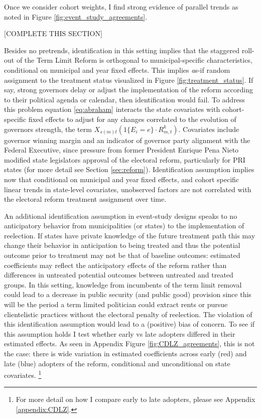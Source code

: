 \documentclass[12pt]{amsart}
\makeatletter
\def\subsection{\@startsection{subsection}{2}
	\z@{.8\linespacing\@plus.7\linespacing}{.7\linespacing}{\large}}
\numberwithin{equation}{section}
\theoremstyle{definition}
\theoremstyle{definition}
\theoremstyle{definition}
\makeatother
\begin{document}
\subsection{Identification \label{sec:identification}}
 
Once we consider cohort weights, I find strong evidence of parallel trends as noted in Figure \ref{fig:event_study_agreements}. 

[COMPLETE THIS SECTION]

 
Besides no pretrends, identification in this setting implies that the staggered roll-out of the Term Limit Reform is orthogonal to municipal-specific characteristics, conditional on municipal and year fixed effects. This implies {\emph as-if} random assignment to the treatment status visualized in Figure \ref{fig:treatment_status}. If say, strong governors delay or adjust the implementation of the reform according to their political agenda or calendar, then identification would fail. To address this problem equation \ref{eq:abraham} interacts the state covariates with cohort-specific fixed effects to adjust for any changes correlated to the evolution of governors strength, the term $X_{s(m)t} (1\{E_i=e\} \cdot R^k_{m,t})$. Covariates include governor winning margin and an indicator of governor party alignment with the Federal Executive, since pressure from former President Enrique Pena Nieto modified state legislators approval of the electoral reform, particularly for PRI states (for more detail see Section \ref{sec:reform}). Identification assumption implies now that conditional on municipal and year fixed effects, and cohort specific linear trends in state-level covariates, unobserved factors are not correlated with the electoral reform treatment assignment over time.     

An additional identification assumption in event-study designs speaks to no anticipatory behavior from municipalities (or states) to the implementation of reelection. If states have private knowledge of the future treatment path this may change their behavior in anticipation to being treated and thus the potential outcome prior to treatment may not be that of baseline outcomes: estimated coefficients may reflect the anticipatory effects of the reform rather than differences in untreated potential outcomes between untreated and treated groups. %
In this setting, knowledge from incumbents of the term limit removal could lead to a decrease in public security (and public good) provision since this will be the period a term limited politician could extract rents or pursue clientelistic practices without the electoral penalty of reelection. The violation of this identification assumption would lead to a (positive) bias of concern. To see if this assumption holds I test whether early vs late adopters differed in their estimated effects. As seen in Appendix Figure \ref{fig:CDLZ_agreements}, this is not the case: there is wide variation in estimated coefficients across early (red) and late (blue) adopters of the reform, conditional and unconditional on state covariates. \footnote{For more detail on how I compare early to late adopters, please see Appendix \ref{appendix:CDLZ}.}
\end{document}
